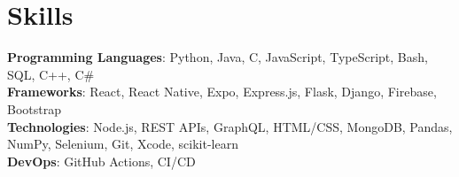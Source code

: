 \section{Skills}
    \begin{itemize}[leftmargin=0.15in, label={}]
	\small{\item{
		\textbf{Programming Languages}{: Python, Java, C, JavaScript, TypeScript, Bash, SQL, C++, C#} \\
		\textbf{Frameworks}{: React, React Native, Expo, Express.js, Flask, Django, Firebase, Bootstrap} \\
		\textbf{Technologies}{: Node.js, REST APIs, GraphQL,  HTML/CSS, MongoDB, Pandas, NumPy, Selenium, Git, Xcode, scikit-learn} \\
		\textbf{DevOps}{: GitHub Actions, CI/CD} \\
	}}
    \end{itemize}
